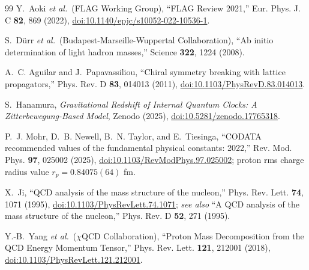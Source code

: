 \documentclass[%
 reprint, amsmath,amssymb, aps, prc, ]{revtex4-2}
\numberwithin{equation}{section}
\begin{document}
\begin{thebibliography}{99}
Y.~Aoki \textit{et al.}\ (FLAG Working Group), ``FLAG Review 2021,'' Eur. Phys. J. C \textbf{82}, 869 (2022), \href{https://doi.org/10.1140/epjc/s10052-022-10536-1}{doi:10.1140/epjc/s10052-022-10536-1}.

S.~D\"urr \textit{et al.}\ (Budapest-Marseille-Wuppertal Collaboration), ``Ab initio determination of light hadron masses,'' Science \textbf{322}, 1224 (2008).

A.~C. Aguilar and J.~Papavassiliou, ``Chiral symmetry breaking with lattice propagators,'' Phys. Rev. D \textbf{83}, 014013 (2011), \href{https://doi.org/10.1103/PhysRevD.83.014013}{doi:10.1103/PhysRevD.83.014013}.

S.~Hanamura, \textit{Gravitational Redshift of Internal Quantum Clocks: A Zitterbewegung-Based Model}, Zenodo (2025), \href{https://doi.org/10.5281/zenodo.17765318}{doi:10.5281/zenodo.17765318}.

P.~J. Mohr, D.~B. Newell, B.~N. Taylor, and E.~Tiesinga, ``CODATA recommended values of the fundamental physical constants: 2022,'' Rev. Mod. Phys. \textbf{97}, 025002 (2025), \href{https://doi.org/10.1103/RevModPhys.97.025002}{doi:10.1103/RevModPhys.97.025002}; proton rms charge radius value $r_p = 0.84075(64)$ fm.

X.~Ji, ``QCD analysis of the mass structure of the nucleon,'' Phys. Rev. Lett. \textbf{74}, 1071 (1995), \href{https://doi.org/10.1103/PhysRevLett.74.1071}{doi:10.1103/PhysRevLett.74.1071}; \textit{see also} ``A QCD analysis of the mass structure of the nucleon,'' Phys. Rev. D \textbf{52}, 271 (1995).

Y.-B.~Yang \textit{et al.}\ ($\chi$QCD Collaboration), ``Proton Mass Decomposition from the QCD Energy Momentum Tensor,'' Phys. Rev. Lett. \textbf{121}, 212001 (2018), \href{https://doi.org/10.1103/PhysRevLett.121.212001}{doi:10.1103/PhysRevLett.121.212001}.

\end{thebibliography}

\end{document}
